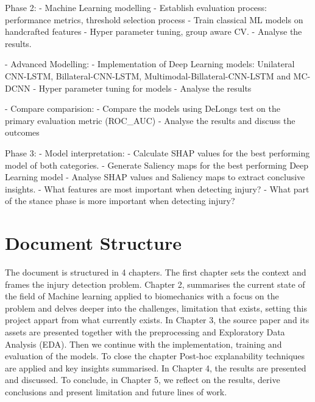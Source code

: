 Phase 2:
- Machine Learning modelling
    - Establish evaluation process: performance metrics, threshold selection process
    - Train classical ML models on handcrafted features
    - Hyper parameter tuning, group aware CV.
    - Analyse the results.

- Advanced Modelling:
    - Implementation of Deep Learning models: Unilateral CNN-LSTM, Billateral-CNN-LSTM, Multimodal-Billateral-CNN-LSTM and MC-DCNN
    - Hyper parameter tuning for models
    - Analyse the results

- Compare comparision:
    - Compare the models using DeLongs test on the primary evaluation metric (ROC_AUC)
    - Analyse the results and discuss the outcomes

Phase 3:
- Model interpretation:
    - Calculate SHAP values for the best performing model of both categories.
    - Generate Saliency maps for the best performing Deep Learning model
    - Analyse SHAP values and Saliency maps to extract conclusive insights.
        - What features are most important when detecting injury?
        - What part of the stance phase is more important when detecting injury?

\section{Document Structure}\label{sec:intro-structure}
The document is structured in 4 chapters. The first chapter sets the context and frames the injury detection problem. Chapter 2, summarises the current state of the field of Machine learning applied to biomechanics with a focus on the problem and delves deeper into the challenges, limitation that exists, setting this project appart from what currently exists. In Chapter 3, the source paper \cite{Ferber2024} and its assets are presented together with the preprocessing and Exploratory Data Analysis (EDA). Then we continue with the implementation, training and evaluation of the models. To close the chapter Post-hoc explanability techniques are applied and key insights summarised. In Chapter 4, the results are presented and discussed. To conclude, in Chapter 5, we reflect on the results, derive conclusions and present limitation and future lines of work.